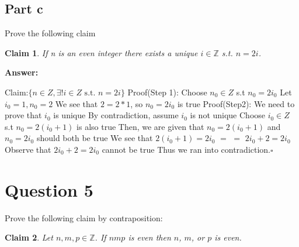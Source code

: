 \documentclass[12pt]{article}
\newtheorem*{claim}{Claim}
\begin{document}
\subsection*{Part c}

Prove the following claim
\begin{claim}
If n is an even integer there exists a unique $i\in\mathbb{Z}$ s.t. $n=2i$.
\end{claim}

{\noindent\bf Answer:}
{
Claim:$\{n \in Z,\exists ! i\in Z\text{ s.t. }n=2i \}$\newline
Proof(Step 1): Choose $n_{0} \in Z$ s.t $n_{0}=2i_{0}$\newline
Let $i_{0}=1,n_{0}=2$\newline
We see that $2=2*1$, so $n_{0}=2i_{0}$ is true\newline
Proof(Step2):\newline
We need to prove that $i_{0}$ is unique\newline
By contradiction, assume  $i_{0}$ is not unique\newline
Choose $i_{0}\in Z$ s.t  $n_{0}=2(i_{0}+1)$ is also true\newline
Then, we are given that $n_{0}=2(i_{0}+1)$ and $n_{0}=2i_{0}$ should both be true\newline
We see that $2(i_{0}+1)=2i_{0}$ $=$\newline
$=$ $2i_{0}+2=2i_{0}$\newline
Observe that $2i_{0}+2=2i_{0}$ cannot be true\newline
Thus we ran into contradiction.$\square$

}
\newpage
\section*{Question 5}

Prove the following claim by contraposition:
\begin{claim}
Let $n,m,p\in\mathbb{Z}$. If $nmp$ is even then $n$, $m$, or $p$ is even.
\end{claim}
\end{document}
